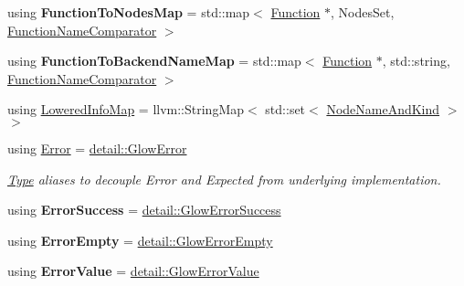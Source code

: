 \begin{DoxyCompactItemize}
\mbox{\label{namespaceglow_a872f72bd7c5e2f8cdc494b659b0b84c4}} 
using {\bfseries Function\+To\+Nodes\+Map} = std\+::map$<$ \hyperlink{classglow_1_1_function}{Function} $\ast$, Nodes\+Set, \hyperlink{structglow_1_1_function_name_comparator}{Function\+Name\+Comparator} $>$
\item 
\mbox{\label{namespaceglow_a37c1a2b21677ddb0baeaff2029675698}} 
using {\bfseries Function\+To\+Backend\+Name\+Map} = std\+::map$<$ \hyperlink{classglow_1_1_function}{Function} $\ast$, std\+::string, \hyperlink{structglow_1_1_function_name_comparator}{Function\+Name\+Comparator} $>$
\item 
using \hyperlink{namespaceglow_a419aca63ca48becda137d774dd06493c}{Lowered\+Info\+Map} = llvm\+::\+String\+Map$<$ std\+::set$<$ \hyperlink{structglow_1_1_node_name_and_kind}{Node\+Name\+And\+Kind} $>$ $>$
\item 
\mbox{\label{namespaceglow_afdb176c3a672ef66db0ecfc19a8d39bf}} 
using \hyperlink{namespaceglow_afdb176c3a672ef66db0ecfc19a8d39bf}{Error} = \hyperlink{classglow_1_1detail_1_1_glow_error}{detail\+::\+Glow\+Error}
\begin{DoxyCompactList}\small\item\em \hyperlink{structglow_1_1_type}{Type} aliases to decouple Error and Expected from underlying implementation. \end{DoxyCompactList}\item 
\mbox{\label{namespaceglow_a19ac4a89f32c03c5721dce8c26d826c1}} 
using {\bfseries Error\+Success} = \hyperlink{classglow_1_1detail_1_1_glow_error_success}{detail\+::\+Glow\+Error\+Success}
\item 
\mbox{\label{namespaceglow_a1bf5d74fc12bce2a8d3e50f8b50322e8}} 
using {\bfseries Error\+Empty} = \hyperlink{classglow_1_1detail_1_1_glow_error_empty}{detail\+::\+Glow\+Error\+Empty}
\item 
\mbox{\label{namespaceglow_a9342b33e8382dfa77f9f36abf16776de}} 
using {\bfseries Error\+Value} = \hyperlink{classglow_1_1detail_1_1_glow_error_value}{detail\+::\+Glow\+Error\+Value}
\item 
\mbox{\label{namespaceglow_a7d81236adc8a9b6e32f0b1244d094ad8}} 

\end{DoxyCompactItemize}
